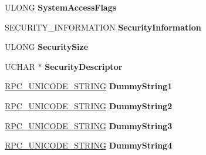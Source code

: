 \begin{DoxyCompactItemize}
U\+L\+O\+NG {\bfseries System\+Access\+Flags}
\item 
\mbox{\label{struct___n_e_t_l_o_g_o_n___d_e_l_t_a___a_c_c_o_u_n_t_s_a04d0a4248504e8301ed52679253c0e1a}} 
S\+E\+C\+U\+R\+I\+T\+Y\+\_\+\+I\+N\+F\+O\+R\+M\+A\+T\+I\+ON {\bfseries Security\+Information}
\item 
\mbox{\label{struct___n_e_t_l_o_g_o_n___d_e_l_t_a___a_c_c_o_u_n_t_s_ac21385e996995fefc1c459f10369167a}} 
U\+L\+O\+NG {\bfseries Security\+Size}
\item 
\mbox{\label{struct___n_e_t_l_o_g_o_n___d_e_l_t_a___a_c_c_o_u_n_t_s_ae9a07ab934595e5ca843efccbb2ce17c}} 
U\+C\+H\+AR $\ast$ {\bfseries Security\+Descriptor}
\item 
\mbox{\label{struct___n_e_t_l_o_g_o_n___d_e_l_t_a___a_c_c_o_u_n_t_s_a7de35b365cc1d17bff8dfb3ae0e4a85b}} 
\hyperlink{struct___r_p_c___u_n_i_c_o_d_e___s_t_r_i_n_g}{R\+P\+C\+\_\+\+U\+N\+I\+C\+O\+D\+E\+\_\+\+S\+T\+R\+I\+NG} {\bfseries Dummy\+String1}
\item 
\mbox{\label{struct___n_e_t_l_o_g_o_n___d_e_l_t_a___a_c_c_o_u_n_t_s_af02fc94f1b8f4712980e52440bc7f393}} 
\hyperlink{struct___r_p_c___u_n_i_c_o_d_e___s_t_r_i_n_g}{R\+P\+C\+\_\+\+U\+N\+I\+C\+O\+D\+E\+\_\+\+S\+T\+R\+I\+NG} {\bfseries Dummy\+String2}
\item 
\mbox{\label{struct___n_e_t_l_o_g_o_n___d_e_l_t_a___a_c_c_o_u_n_t_s_a5c7046a80581b1ef8f689bc483678f64}} 
\hyperlink{struct___r_p_c___u_n_i_c_o_d_e___s_t_r_i_n_g}{R\+P\+C\+\_\+\+U\+N\+I\+C\+O\+D\+E\+\_\+\+S\+T\+R\+I\+NG} {\bfseries Dummy\+String3}
\item 
\mbox{\label{struct___n_e_t_l_o_g_o_n___d_e_l_t_a___a_c_c_o_u_n_t_s_a550699d5f269e19a7ad4668f70d1fb28}} 
\hyperlink{struct___r_p_c___u_n_i_c_o_d_e___s_t_r_i_n_g}{R\+P\+C\+\_\+\+U\+N\+I\+C\+O\+D\+E\+\_\+\+S\+T\+R\+I\+NG} {\bfseries Dummy\+String4}
\item 

\end{DoxyCompactItemize}
